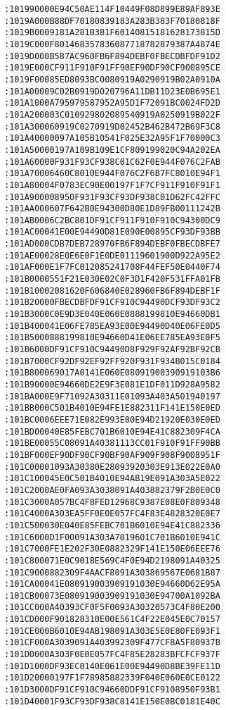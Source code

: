\begin{lstlisting}[language={}, basicstyle=\scriptsize, caption=Машинний код]
:101990000E94C50AE114F10449F08D899E89AF893E
:1019A000B88DF70180839183A283B383F70180818F
:1019B0009181A281B381F60140815181628173815D
:1019C000F801468357836087718782879387A4874E
:1019D000B587AC960FB6F894DEBF0FBECDBFDF91D2
:1019E000CF911F910F91FF90EF90DF90CF900895CE
:1019F00085ED8093BC0080919A0290919B02A0910A
:101A00009C02B0919D020796A11DB11D23E0B695E1
:101A1000A795979587952A95D1F72091BC0024FD2D
:101A200003C010929802089540919A0250919B022F
:101A300060919C0270919D02452B462B472B69F3C8
:101A40000097A105B10541F025E32A95F1F70000C3
:101A50000197A109B109E1CF809199020C94A202EA
:101A60000F931F93CF938C01C62F0E944F076C2FAB
:101A70006460C8010E944F076C2F6B7FC8010E94F1
:101A80004F0783EC90E00197F1F7CF911F910F91F1
:101A900008950F931F93CF93DF938C01D62FC42FFC
:101AA000607F642B0E94300D80E1D89FB00111242B
:101AB0006C2BC801DF91CF911F910F910C94300DC9
:101AC00041E00E94490D81E090E00895CF93DF93BB
:101AD000CDB7DEB728970FB6F894DEBF0FBECDBFE7
:101AE00028E0E6E0F1E0DE01119601900D922A95E2
:101AF000E1F7FC012085241708F44FEF50E0440F74
:101B0000551F21E030E02C0F3D1F420F531FFA01FB
:101B10002081620F606840E028960FB6F894DEBF1F
:101B20000FBECDBFDF91CF910C94490DCF93DF93C2
:101B3000C0E9D3E040E060E0888199810E94660DB1
:101B400041E06FE785EA93E00E94490D40E06FE0D5
:101B5000888199810E94660D41E06EE785EA93E0F5
:101B6000DF91CF910C94490D8F929F92AF92BF92CB
:101B7000CF92DF92EF92FF920F931F934B015C0184
:101B800069017A0141E060E08091900390919103B6
:101B90000E94660DE2E9F3E081E1DF011D928A9582
:101BA000E9F71092A30311E01093A403A501940197
:101BB000C501B4010E94FE1E882311F141E150E0ED
:101BC0006EEE71E082E993E00E94D21920E030E0ED
:101BD00040E85FEBC701B6010E94E41C882309F4CA
:101BE00055C08091A40381113CC01F910F91FF90BB
:101BF000EF90DF90CF90BF90AF909F908F9008951F
:101C00001093A30380E28093920303E913E022E0A0
:101C100045E0C501B4010E94AB19E091A303A5E022
:101C2000AE0FA093A3038091A403882379F2B0E0C0
:101C3000A057BC4F8FED12968C9387E08E0F809348
:101C4000A303EA5FF0E0E057FC4F83E4828320E0E7
:101C500030E040E85FEBC701B6010E94E41C882336
:101C6000D1F00091A303A7019601C701B6010E941C
:101C7000FE1E202F30E0882329F141E150E06EEE76
:101C800071E0C9018E569C4F0E94D2198091A40325
:101C9000882309F4AACF8091A303869567E0681B87
:101CA00041E080919003909191030E94660D62E95A
:101CB00073E080919003909191030E94700A1092BA
:101CC000A40393CF0F5F0093A30320573C4F80E200
:101CD000F901828310E00E561C4F22E045E0C70157
:101CE000B6010E94AB198091A303E5E0E80FE093F1
:101CF000A3039091A403992309F477CF8A5F80937B
:101D0000A303F0E0E057FC4F85E28283BFCFCF937F
:101D1000DF93EC0140E061E00E94490D8BE39FE11D
:101D20000197F1F78985882339F040E060E0CE0122
:101D3000DF91CF910C94660DDF91CF9108950F93B1
:101D40001F93CF93DF938C0141E150E0BC0181E40C

\end{lstlisting}

